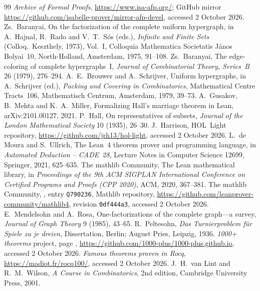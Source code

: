 \documentclass[11pt]{article}
\theoremstyle{definition}
\theoremstyle{remark}
\begin{document}
\begin{thebibliography}{99}\sloppy
{} \emph{Archive of Formal Proofs}, \url{https://www.isa-afp.org/}; GitHub mirror
\url{https://github.com/isabelle-prover/mirror-afp-devel}, accessed 2 October 2026.
 Zs.~Baranyai, On the factorization of the complete uniform hypergraph, in
A.~Hajnal, R.~Rado and V.~T.~S\'os (eds.), \emph{Infinite and Finite Sets} (Colloq.\ Keszthely,
1973), Vol.~I, Colloquia Mathematica Societatis J\'anos Bolyai~10, North-Holland, Amsterdam, 1975,
91--108.
 Zs.~Baranyai, The edge-coloring of complete hypergraphs~I, \emph{Journal of
Combinatorial Theory, Series~B} 26 (1979), 276--294.
 A.~E.~Brouwer and A.~Schrijver, Uniform hypergraphs, in A.~Schrijver
(ed.), \emph{Packing and Covering in Combinatorics}, Mathematical Centre Tracts~106, Mathematisch
Centrum, Amsterdam, 1979, 39--73.
 A.~Gusakov, B.~Mehta and K.~A.~Miller, Formalizing Hall's marriage theorem in
Lean, arXiv:2101.00127, 2021.
 P.~Hall, On representatives of subsets, \emph{Journal of the London Mathematical
Society} 10 (1935), 26--30.
 J.~Harrison, HOL~Light repository, \url{https://github.com/jrh13/hol-light},
accessed 2 October 2026.
 L.~de Moura and S.~Ullrich, The Lean~4 theorem prover and programming language, in
\emph{Automated Deduction -- CADE~28}, Lecture Notes in Computer Science 12699, Springer, 2021,
625--635.
 The mathlib Community, The Lean mathematical library, in \emph{Proceedings of the
9th ACM SIGPLAN International Conference on Certified Programs and Proofs (CPP 2020)}, ACM, 2020,
367--381.
 The mathlib Community, , entry \texttt{Q790236}, Mathlib
repository, \url{https://github.com/leanprover-community/mathlib4}, revision \texttt{0df444a3},
accessed 2 October 2026.
 E.~Mendelsohn and A.~Rosa, One-factorizations of the complete graph---a
survey, \emph{Journal of Graph Theory} 9 (1985), 43--65.
 R.~Peltesohn, \emph{Das Turnierproblem f\"ur Spiele zu je dreien}, Dissertation,
Berlin; August Pries, Leipzig, 1936.
 \emph{1000+ theorems} project, page ,
\url{https://github.com/1000-plus/1000-plus.github.io}, accessed 2 October 2026.
 \emph{Famous theorems proven in Rocq}, \url{https://madiot.fr/rocq100/}, accessed
2 October 2026.
 J.~H.~van Lint and R.~M.~Wilson, \emph{A Course in Combinatorics}, 2nd edition,
Cambridge University Press, 2001.
\end{thebibliography}
\end{document}
